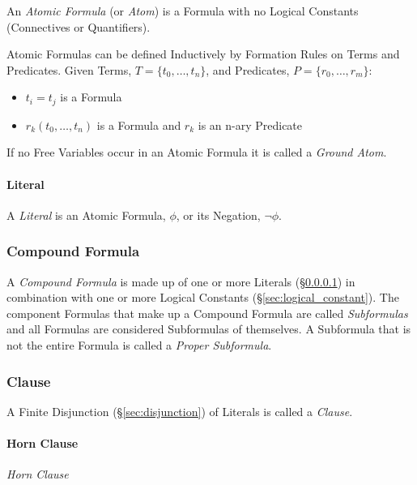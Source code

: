 An \emph{Atomic Formula} (or \emph{Atom}) is a Formula with no Logical
Constants (Connectives or Quantifiers).

Atomic Formulas can be defined Inductively by Formation Rules on Terms
and Predicates. Given Terms, $T = \{t_0,\ldots,t_n\}$, and Predicates,
$P = \{r_0,\ldots,r_m\}$:
\begin{itemize}
  \item $t_i = t_j$ is a Formula
  \item $r_k(t_0,\ldots,t_n)$ is a Formula and $r_k$ is an n-ary
    Predicate
\end{itemize}
If no Free Variables occur in an Atomic Formula it is called a
\emph{Ground Atom}.



\paragraph{Literal}\label{sec:literal}\hfill

A \emph{Literal} is an Atomic Formula, $\phi$, or its Negation, $\neg
\phi$.



\subsubsection{Compound Formula}\label{sec:compound_formula}

A \emph{Compound Formula} is made up of one or more Literals
(\S\ref{sec:literal}) in combination with one or more Logical
Constants (\S\ref{sec:logical_constant}). The component Formulas that
make up a Compound Formula are called \emph{Subformulas} and all
Formulas are considered Subformulas of themselves. A Subformula that
is not the entire Formula is called a \emph{Proper Subformula}.



\subsubsection{Clause}\label{sec:clause}

A Finite Disjunction (\S\ref{sec:disjunction}) of Literals is called a
\emph{Clause}.



\paragraph{Horn Clause}\label{sec:horn_clause}\hfill

\emph{Horn Clause}



